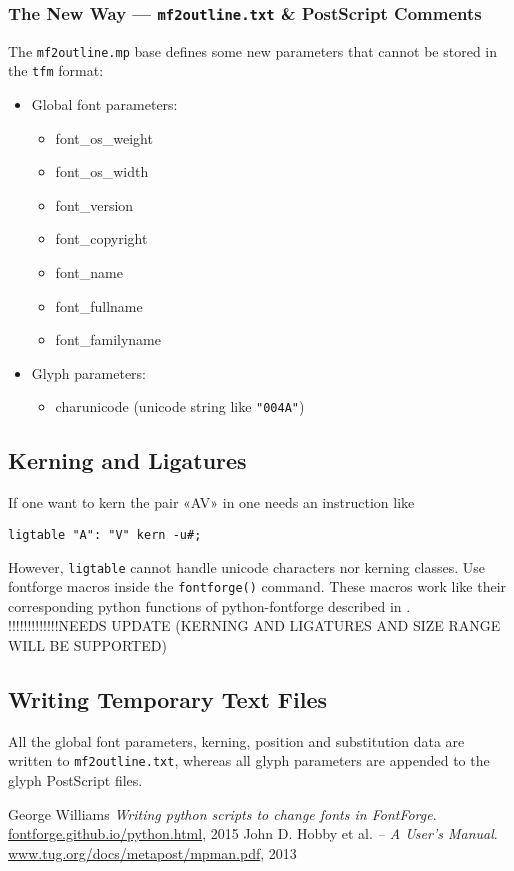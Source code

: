 \documentclass{scrartcl}
\begin{document}
\subsubsection{The New Way --- \texttt{mf2outline.txt} \& PostScript Comments}
%
The \texttt{mf2outline.mp} base defines some new parameters that cannot be stored in the \texttt{tfm} format:
\begin{itemize}
	\item Global font parameters:
	\begin{itemize}
		\item font\_os\_weight
		\item font\_os\_width
		\item font\_version
		\item font\_copyright
		\item font\_name
		\item font\_fullname
		\item font\_familyname
	\end{itemize}
	\item Glyph parameters:
	\begin{itemize}
		\item charunicode (unicode string like \verb|"004A"|)
	\end{itemize}
\end{itemize}
%
\subsection{Kerning and Ligatures}
%
If one want to kern the pair «AV» in \MF{} one needs an instruction like
\lstset{language=MetaPost,columns=fullflexible}
\begin{lstlisting}
ligtable "A": "V" kern -u#;
\end{lstlisting}
However, \texttt{ligtable} cannot handle unicode characters nor kerning classes. Use fontforge macros inside the \verb|fontforge()| command. These macros work like their corresponding python functions of python-fontforge described in \cite{williams15}.
!!!!!!!!!!!!!NEEDS UPDATE (KERNING AND LIGATURES AND SIZE RANGE WILL BE SUPPORTED)
%
\subsection{Writing Temporary Text Files}
%
All the global font parameters, kerning, position and substitution data are written to \texttt{mf2outline.txt}, whereas all glyph parameters are appended to the glyph PostScript files.
%
\begin{thebibliography}{Williams15}
	George Williams
	\emph{Writing python scripts to change fonts in FontForge}.
	\url{fontforge.github.io/python.html}, 2015
	John D. Hobby et al.
	\emph{\MP{} -- A User's Manual}.
	\url{www.tug.org/docs/metapost/mpman.pdf}, 2013
\end{thebibliography}
\end{document}
